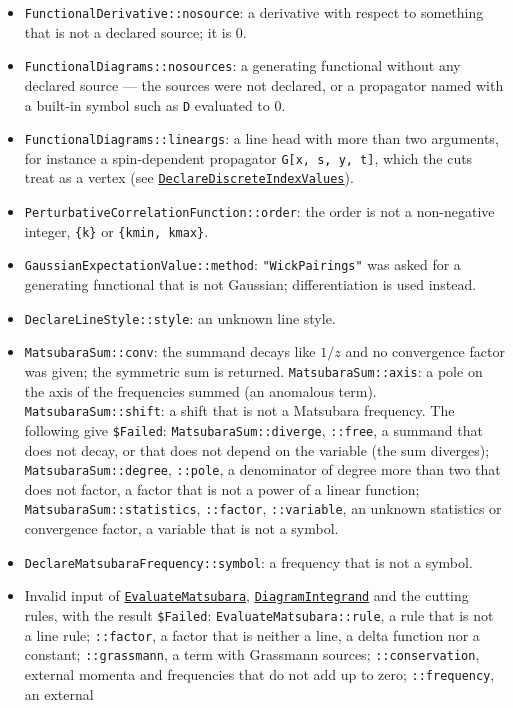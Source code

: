 \documentclass[11pt,a4paper]{article}
\newcommand{\pkg}[1]{\texttt{#1}}
\newcommand{\fnref}[1]{\hyperref[fn:#1]{\pkg{#1}}}
\newcommand{\opt}[1]{\texttt{"#1"}}
\begin{document}
\begin{itemize}
  loses their order; write them as separate entries of the list of fields, or with \pkg{**}. The result is \pkg{\$Failed}.
\item \pkg{FunctionalDerivative::nosource}: a derivative with respect to something that is not a declared source; it
  is 0.
\item \pkg{FunctionalDiagrams::nosources}: a generating functional without any declared source --- the sources were not
  declared, or a propagator named with a built-in symbol such as \pkg{D} evaluated to 0.
\item \pkg{FunctionalDiagrams::lineargs}: a line head with more than two arguments, for instance a spin-dependent
  propagator \pkg{G[x, s, y, t]}, which the cuts treat as a vertex (see \fnref{DeclareDiscreteIndexValues}).
\item \pkg{PerturbativeCorrelationFunction::order}: the order is not a non-negative integer, \pkg{\{k\}} or
  \pkg{\{kmin, kmax\}}.
\item \pkg{GaussianExpectationValue::method}: \opt{WickPairings} was asked for a generating functional that is not Gaussian;
  differentiation is used instead.
\item \pkg{DeclareLineStyle::style}: an unknown line style.
\item \pkg{MatsubaraSum::conv}: the summand decays like $1/z$ and no convergence factor was given; the symmetric sum is
  returned. \pkg{MatsubaraSum::axis}: a pole on the axis of the frequencies summed (an anomalous term).
  \pkg{MatsubaraSum::shift}: a shift that is not a Matsubara frequency. The following give \pkg{\$Failed}:
  \pkg{MatsubaraSum::diverge}, \pkg{::free}, a summand that does not decay, or that does not depend on the variable (the
  sum diverges); \pkg{MatsubaraSum::degree}, \pkg{::pole}, a denominator of degree more than two that does not factor, a
  factor that is not a power of a linear function; \pkg{MatsubaraSum::statistics}, \pkg{::factor}, \pkg{::variable}, an
  unknown statistics or convergence factor, a variable that is not a symbol.
\item \pkg{DeclareMatsubaraFrequency::symbol}: a frequency that is not a symbol.
\item Invalid input of \fnref{EvaluateMatsubara}, \fnref{DiagramIntegrand} and the cutting rules, with the result
  \pkg{\$Failed}: \pkg{EvaluateMatsubara::rule}, a rule that is not a line rule; \pkg{::factor}, a factor that is
  neither a line, a delta function nor a constant; \pkg{::grassmann}, a term with Grassmann sources;
  \pkg{::conservation}, external momenta and frequencies that do not add up to zero; \pkg{::frequency}, an external

\end{itemize}
\end{document}
